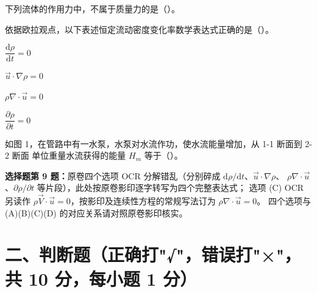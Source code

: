 \begin{ti}
  \item 下列流体的作用力中，不属于质量力的是（\quad）。\hfill{}

  \item 依据欧拉观点，以下表述恒定流动密度变化率数学表达式正确的是（\quad）。\hfill{}
  \begin{choices}
    \item $\dfrac{\mathrm{d}\rho}{\mathrm{d}t}=0$
    \item $\vec u\cdot\nabla\rho=0$
    \item $\rho\nabla\cdot\vec u=0$
    \item $\dfrac{\partial\rho}{\partial t}=0$
  \end{choices}

  \item 如图 1，在管路中有一水泵，水泵对水流作功，使水流能量增加，从 1-1 断面到 2-2 断面
  单位重量水流获得的能量 $H_m$ 等于（\quad）。\hfill{}
\end{ti}

\begin{tishi}
\textbf{选择题第 9 题：}原卷四个选项 OCR 分解错乱（分别碎成 $\mathrm{d}\rho/\mathrm{d}t$、$\vec u\cdot\nabla\rho$、
$\rho\nabla\cdot\vec u$、$\partial\rho/\partial t$ 等片段），此处按原卷影印逐字转写为四个完整表达式；
选项 (C) OCR 另读作 $\rho\vec V\cdot\vec u=0$，按影印及连续性方程的常规写法订为 $\rho\nabla\cdot\vec u=0$。
四个选项与 (A)(B)(C)(D) 的对应关系请对照原卷影印核实。
\end{tishi}

\section{二、判断题（正确打"√"，错误打"×"，共 10 分，每小题 1 分）}

